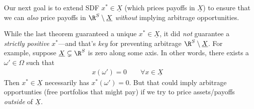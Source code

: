 \documentclass[12pt]{article}
\theoremstyle{plain}
\theoremstyle{definition}
\theoremstyle{remark}
\begin{document}
\begin{multicols*}{2}

\clearpage

Our next goal is to extend SDF $x^*\in\underline{X}$ (which prices
payoffs in $\underline{X}$) to ensure that we can \emph{also} price
payoffs in $\R^S\setminus\underline{X}$ \emph{without} implying
arbitrage opportunities.

While the last theorem guaranteed a unique $x^*\in\underline{X}$, it
did \emph{not} guarantee a \emph{strictly positive} $x^*$---and that's
\emph{key} for preventing arbitrage $\R^S\setminus\underline{X}$.
For example, suppose $\underline{X}\subsetneq\R^S$ is zero along
some axis. In other words, there exists a $\omega'\in\Omega$ such that
\begin{align*}
  x(\omega') = 0
  \qquad \forall x\in \underline{X}
\end{align*}
Then $x^*\in\underline{X}$ necessarily has $x^*(\omega')=0$.
But that could imply arbitrage opportunties (free portfolios that might
pay) if we try to price assets/payoffs \emph{outside} of
$\underline{X}$.


\end{multicols*}
\end{document}
